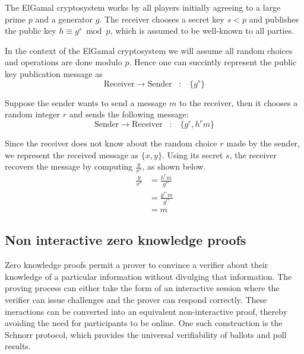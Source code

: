 The ElGamal cryptosystem works by all players initially agreeing to a large prime $p$
and a generator $g$.  The receiver chooses a secret key $s < p$ and publishes
the public key $h \equiv g^s \bmod p$, which is assumed to be well-known to
all parties.

In the context of the ElGamal cryptosystem
we will assume all random choices and operations are done
modulo $p$.  Hence one can succintly represent the
public key publication message as
\[
\text{Receiver} \rightarrow \text{Sender} \hspace{10pt} : \hspace{10pt} \{g^s\}  
\]

Suppose the sender wants to send a message $m$ to the receiver, then it chooses
a random integer $r$ and sends the following message:
\[
\text{Sender} \rightarrow \text{Receiver} \hspace{10pt} : \hspace{10pt} \{g^r, h^rm\}
\]

Since the receiver does not know about the random choice $r$ made by the sender, we
represent the received message as $\{x, y\}$.  Using its secret $s$, the receiver recovers
the message by computing $\frac{y}{x^s}$, as shown below.
\begin{equation} \label{eq1}
\begin{split}
\frac{y}{x^s} & = \frac{h^rm}{g^{r^s}} \\
              & = \frac{g^{r^s}m}{g^{r^s}}\\
              & = m
\end{split}
\end{equation}

\subsection{Non interactive zero knowledge proofs}

Zero knowledge proofs permit a prover to convince a verifier about their knowledge
of a particular information without divulging that information.  The proving
process can either take the form of an interactive session where the verifier
can issue challenges and the prover can respond correctly.  These ineractions can
be converted into an equivalent non-interactive proof, thereby avoiding the need for participants
to be online.  One such construction is the Schnorr protocol, which 
provides the universal verifiability of ballots and poll results.

